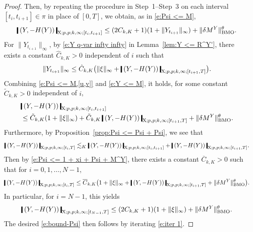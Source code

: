 \documentclass[11pt,reqno]{amsart}
\numberwithin{equation}{section}
\newcommand{\shortthickbar}{%
  \vcenter{\hbox{\rule{1.8pt}{2.2ex}}}%
}
\newcommand{\thicknm}[1]{%
  \mathopen{\shortthickbar}%
  \mkern4mu #1 \mkern4mu%
  \mathclose{\shortthickbar}%
}
\begin{document}
\begin{proof}
Then, by repeating the procedure in Step~1--Step~3 on each interval $[t_i,t_{i+1}]\in \pi$ in place of $[0,T]$, we obtain, as in \eqref{e:Psi <= M}, 
\begin{equation}\label{e:Psi <= M,[u,v]}
\thicknm{(Y,-H(Y))}_{\mathrm X;p,p;k,\infty;[t_{i},t_{i+1}]} \le (2 C_{k,K} +1) (1 + \|Y_{t_{i+1}}\|_{\infty}) + \|\delta M^{Y}\|^{\theta}_{\mathrm{BMO}}.
\end{equation}
For $\|Y_{t_{i+1}}\|_{\infty}$, by \eqref{e:Y q-var infty infty} in Lemma~\ref{lem:Y <= R^Y'}, there exists a constant $\hat C_{k,K} > 0$ independent of $i$ such that  
\begin{equation}\label{e:Y <= M}
\|Y_{t_{i+1}}\|_{\infty} \le \hat C_{k,K} \big(\|\xi\|_{\infty} + \thicknm{(Y,-H(Y))}_{\mathrm X;p,p;k,\infty;[t_{i+1},T]}\big).
\end{equation}
Combining \eqref{e:Psi <= M,[u,v]} and \eqref{e:Y <= M}, it holds, for some constant $\tilde{C}_{k,K} > 0$ independent of $i$, 
\begin{equation}\label{e:Psi <= 1 + xi + Psi + M^Y}
\begin{aligned}
&\thicknm{(Y,-H(Y))}_{\mathrm X;p,p;k,\infty;[t_{i},t_{i+1}]} \\
&\le  \tilde{C}_{k,K} (1 + \|\xi\|_{\infty}) + \tilde{C}_{k,K}\, \thicknm{(Y,-H(Y))}_{\mathrm X;p,p;k,\infty;[t_{i+1},T]} + \|\delta M^{Y}\|^{\theta}_{\mathrm{BMO}}.
\end{aligned}
\end{equation}
Furthermore, by Proposition~\ref{prop:Psi <= Psi + Psi}, we see that 
\begin{equation*}
\thicknm{(Y,-H(Y))}_{\mathrm X;p,p;k,\infty;[t_{i},T]} \lesssim_{K} \thicknm{(Y,-H(Y))}_{\mathrm X;p,p;k,\infty;[t_{i},t_{i+1}]} + \thicknm{ (Y,-H(Y))}_{\mathrm X;p,p; k,\infty;[t_{i+1},T]}.
\end{equation*} 
Then by \eqref{e:Psi <= 1 + xi + Psi + M^Y}, there exists a constant $\overline{C}_{k,K} > 0$ such that for $i=0,1,\dots, N - 1$,
\begin{equation}\label{e:iter 1}
\thicknm{(Y,-H(Y))}_{\mathrm X;p,p;k,\infty;[t_{i},T]} \le \overline{C}_{k,K}\big(1 + \|\xi\|_{\infty} + \thicknm{(Y,-H(Y))}_{\mathrm X;p,p;k,\infty;[t_{i+1},T]} + \|\delta M^{Y}\|^{\theta}_{\mathrm{BMO}} \big).
\end{equation}
In particular, for $i = N - 1$, this yields
\begin{equation*}
\thicknm{(Y,-H(Y))}_{\mathrm X;p,p;k,\infty;[t_{N - 1},T]} \le (2C_{k,K} + 1)(1+\|\xi\|_{\infty}) + \|\delta M^{Y}\|^{\theta}_{\mathrm{BMO}}.
\end{equation*}
The desired \eqref{e:bound-Psi} then follows by iterating \eqref{e:iter 1}.
\end{proof}
\end{document}
